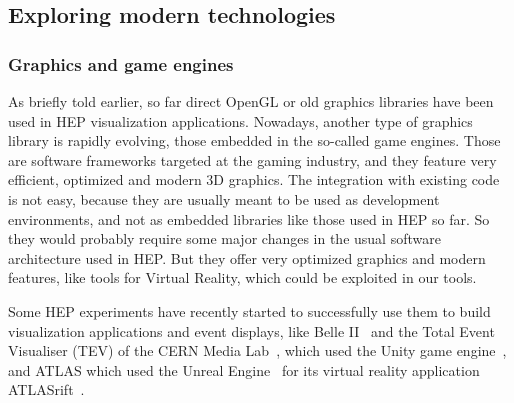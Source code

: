 \documentclass[12pt,a4paper]{article}
\begin{document}
\hypertarget{modern-tech}{%
\subsection{Exploring modern technologies}\label{modern-tech}}

\hypertarget{graphic-engines}{%
\subsubsection{Graphics and game engines}\label{graphic-engines}}

As briefly told earlier, so far direct OpenGL or old graphics libraries have been used in HEP visualization applications. Nowadays,
another type of graphics library is rapidly evolving, those embedded in the so-called game engines. Those are software frameworks
targeted at the gaming industry, and they feature very efficient, optimized and modern 3D graphics.
The integration with existing code is not easy, because they are usually meant to be used as development environments, and not as
embedded libraries like those used in HEP so far. So they would probably require some major changes in the usual software architecture
used in HEP. But they offer very optimized graphics and modern features, like tools for Virtual Reality, which could be exploited in our tools.

Some HEP experiments have recently started to successfully use them to build visualization applications and event displays,
like Belle II~\cite{BelleIIVR} and the Total Event Visualiser (TEV) of the CERN Media Lab~\cite{CERNTEV}, which used the Unity
game engine~\cite{Unity3D}, and ATLAS which used the Unreal Engine~\cite{EpicUnreal} for its virtual reality application
ATLASrift~\cite{ATLASRift}.
\end{document}
